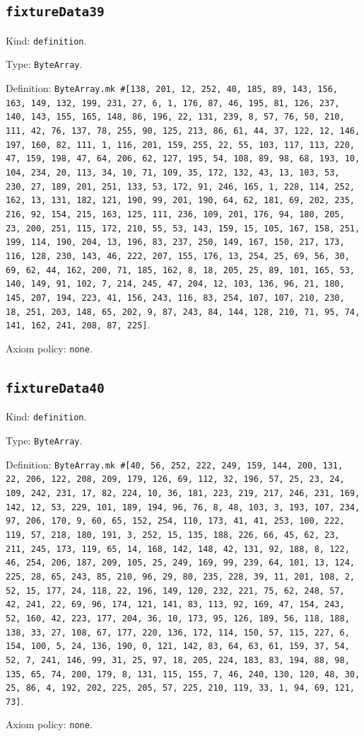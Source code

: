 \documentclass[11pt]{article}
\begin{document}
\subsection*{\texttt{fixtureData39}}
\noindent Kind: \texttt{definition}.\par
\noindent Type: \texttt{ByteArray}.\par
\noindent Definition: \texttt{ByteArray.mk \#[138, 201, 12, 252, 40, 185, 89, 143, 156, 163, 149, 132, 199, 231, 27, 6, 1, 176, 87, 46, 195, 81, 126, 237, 140, 143, 155, 165, 148, 86, 196, 22, 131, 239, 8, 57, 76, 50, 210, 111, 42, 76, 137, 78, 255, 90, 125, 213, 86, 61, 44, 37, 122, 12, 146, 197, 160, 82, 111, 1, 116, 201, 159, 255, 22, 55, 103, 117, 113, 220, 47, 159, 198, 47, 64, 206, 62, 127, 195, 54, 108, 89, 98, 68, 193, 10, 104, 234, 20, 113, 34, 10, 71, 109, 35, 172, 132, 43, 13, 103, 53, 230, 27, 189, 201, 251, 133, 53, 172, 91, 246, 165, 1, 228, 114, 252, 162, 13, 131, 182, 121, 190, 99, 201, 190, 64, 62, 181, 69, 202, 235, 216, 92, 154, 215, 163, 125, 111, 236, 109, 201, 176, 94, 180, 205, 23, 200, 251, 115, 172, 210, 55, 53, 143, 159, 15, 105, 167, 158, 251, 199, 114, 190, 204, 13, 196, 83, 237, 250, 149, 167, 150, 217, 173, 116, 128, 230, 143, 46, 222, 207, 155, 176, 13, 254, 25, 69, 56, 30, 69, 62, 44, 162, 200, 71, 185, 162, 8, 18, 205, 25, 89, 101, 165, 53, 140, 149, 91, 102, 7, 214, 245, 47, 204, 12, 103, 136, 96, 21, 180, 145, 207, 194, 223, 41, 156, 243, 116, 83, 254, 107, 107, 210, 230, 18, 251, 203, 148, 65, 202, 9, 87, 243, 84, 144, 128, 210, 71, 95, 74, 141, 162, 241, 208, 87, 225]}.\par
\noindent Axiom policy: \texttt{none}.\par
\subsection*{\texttt{fixtureData40}}
\noindent Kind: \texttt{definition}.\par
\noindent Type: \texttt{ByteArray}.\par
\noindent Definition: \texttt{ByteArray.mk \#[40, 56, 252, 222, 249, 159, 144, 200, 131, 22, 206, 122, 208, 209, 179, 126, 69, 112, 32, 196, 57, 25, 23, 24, 109, 242, 231, 17, 82, 224, 10, 36, 181, 223, 219, 217, 246, 231, 169, 142, 12, 53, 229, 101, 189, 194, 96, 76, 8, 48, 103, 3, 193, 107, 234, 97, 206, 170, 9, 60, 65, 152, 254, 110, 173, 41, 41, 253, 100, 222, 119, 57, 218, 180, 191, 3, 252, 15, 135, 188, 226, 66, 45, 62, 23, 211, 245, 173, 119, 65, 14, 168, 142, 148, 42, 131, 92, 188, 8, 122, 46, 254, 206, 187, 209, 105, 25, 249, 169, 99, 239, 64, 101, 13, 124, 225, 28, 65, 243, 85, 210, 96, 29, 80, 235, 228, 39, 11, 201, 108, 2, 52, 15, 177, 24, 118, 22, 196, 149, 120, 232, 221, 75, 62, 248, 57, 42, 241, 22, 69, 96, 174, 121, 141, 83, 113, 92, 169, 47, 154, 243, 52, 160, 42, 223, 177, 204, 36, 10, 173, 95, 126, 189, 56, 118, 188, 138, 33, 27, 108, 67, 177, 220, 136, 172, 114, 150, 57, 115, 227, 6, 154, 100, 5, 24, 136, 190, 0, 121, 142, 83, 64, 63, 61, 159, 37, 54, 52, 7, 241, 146, 99, 31, 25, 97, 18, 205, 224, 183, 83, 194, 88, 98, 135, 65, 74, 200, 179, 8, 131, 115, 155, 7, 46, 240, 130, 120, 48, 30, 25, 86, 4, 192, 202, 225, 205, 57, 225, 210, 119, 33, 1, 94, 69, 121, 73]}.\par
\noindent Axiom policy: \texttt{none}.\par
\end{document}
